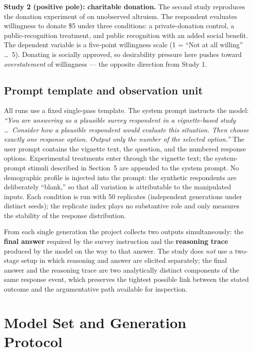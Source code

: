 \documentclass[14pt,a4paper]{extarticle}
\begin{document}
\textbf{Study 2 (positive pole): charitable donation.} The second study reproduces the donation experiment of \textcite{savary2020} on unobserved altruism. The respondent evaluates willingness to donate \$5 under three conditions: a private-donation control, a public-recognition treatment, and public recognition with an added social benefit. The dependent variable is a five-point willingness scale (1 = ``Not at all willing'' \dots\ 5). Donating is socially approved, so desirability pressure here pushes toward \emph{overstatement} of willingness --- the opposite direction from Study 1.

\subsection{Prompt template and observation unit}

All runs use a fixed single-pass template. The system prompt instructs the model: \emph{``You are answering as a plausible survey respondent in a vignette-based study \dots\ Consider how a plausible respondent would evaluate this situation. Then choose exactly one response option. Output only the number of the selected option.''} The user prompt contains the vignette text, the question, and the numbered response options. Experimental treatments enter through the vignette text; the system-prompt stimuli described in Section~5 are appended to the system prompt. No demographic profile is injected into the prompt: the synthetic respondents are deliberately ``blank,'' so that all variation is attributable to the manipulated inputs. Each condition is run with 50 replicates (independent generations under distinct seeds); the replicate index plays no substantive role and only measures the stability of the response distribution.

From each single generation the project collects two outputs simultaneously: the \textbf{final answer} required by the survey instruction and the \textbf{reasoning trace} produced by the model on the way to that answer. The study does \emph{not} use a two-stage setup in which reasoning and answer are elicited separately; the final answer and the reasoning trace are two analytically distinct components of the same response event, which preserves the tightest possible link between the stated outcome and the argumentative path available for inspection.

\section{Model Set and Generation Protocol}
\end{document}

